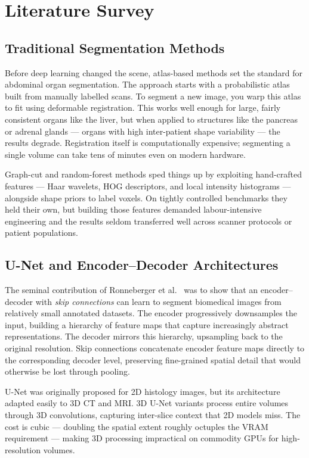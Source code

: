 \chapter{Literature Survey}
\label{chap:lit}

\section{Traditional Segmentation Methods}

Before deep learning changed the scene, atlas-based methods set the standard for abdominal organ segmentation. The approach starts with a probabilistic atlas built from manually labelled scans. To segment a new image, you warp this atlas to fit using deformable registration. This works well enough for large, fairly consistent organs like the liver, but when applied to structures like the pancreas or adrenal glands --- organs with high inter-patient shape variability --- the results degrade. Registration itself is computationally expensive; segmenting a single volume can take tens of minutes even on modern hardware.

Graph-cut and random-forest methods sped things up by exploiting hand-crafted features --- Haar wavelets, HOG descriptors, and local intensity histograms --- alongside shape priors to label voxels. On tightly controlled benchmarks they held their own, but building those features demanded labour-intensive engineering and the results seldom transferred well across scanner protocols or patient populations.

\section{U-Net and Encoder--Decoder Architectures}

The seminal contribution of Ronneberger et al.~\cite{ronneberger2015} was to show that an encoder--decoder with \emph{skip connections} can learn to segment biomedical images from relatively small annotated datasets. The encoder progressively downsamples the input, building a hierarchy of feature maps that capture increasingly abstract representations. The decoder mirrors this hierarchy, upsampling back to the original resolution. Skip connections concatenate encoder feature maps directly to the corresponding decoder level, preserving fine-grained spatial detail that would otherwise be lost through pooling.

U-Net was originally proposed for 2D histology images, but its architecture adapted easily to 3D CT and MRI. 3D U-Net variants process entire volumes through 3D convolutions, capturing inter-slice context that 2D models miss. The cost is cubic --- doubling the spatial extent roughly octuples the VRAM requirement --- making 3D processing impractical on commodity GPUs for high-resolution volumes.

